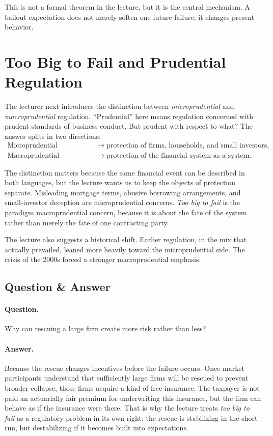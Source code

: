 This is not a formal theorem in the lecture, but it is the central mechanism. A bailout expectation does not merely soften one future failure; it changes present behavior.

\section{Too Big to Fail and Prudential Regulation}

The lecturer next introduces the distinction between \emph{microprudential} and \emph{macroprudential} regulation. ``Prudential'' here means regulation concerned with prudent standards of business conduct. But prudent with respect to what? The answer splits in two directions:
\begin{align}
\text{Microprudential regulation}
&\longrightarrow
\text{protection of firms, households, and small investors},\\
\text{Macroprudential regulation}
&\longrightarrow
\text{protection of the financial system as a system}.
\end{align}

The distinction matters because the same financial event can be described in both languages, but the lecture wants us to keep the objects of protection separate. Misleading mortgage terms, abusive borrowing arrangements, and small-investor deception are microprudential concerns. \emph{Too big to fail} is the paradigm macroprudential concern, because it is about the fate of the system rather than merely the fate of one contracting party.

The lecture also suggests a historical shift. Earlier regulation, in the mix that actually prevailed, leaned more heavily toward the microprudential side. The crisis of the 2000s forced a stronger macroprudential emphasis.

\subsection{Question \& Answer}

\paragraph{Question.} Why can rescuing a large firm create more risk rather than less?

\paragraph{Answer.} Because the rescue changes incentives before the failure occurs. Once market participants understand that sufficiently large firms will be rescued to prevent broader collapse, those firms acquire a kind of free insurance. The taxpayer is not paid an actuarially fair premium for underwriting this insurance, but the firm can behave as if the insurance were there. That is why the lecture treats \emph{too big to fail} as a regulatory problem in its own right: the rescue is stabilizing in the short run, but destabilizing if it becomes built into expectations.

